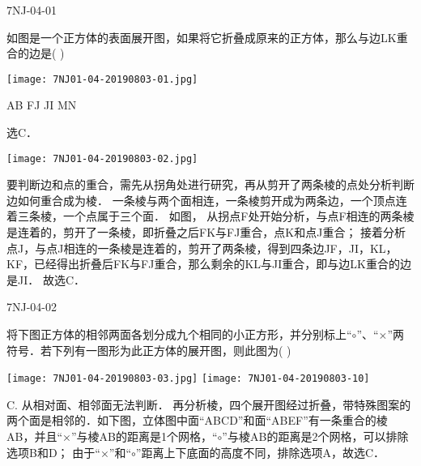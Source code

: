 \begin{defproblem}{7NJ-04-01}%
\begin{onlyproblem}%
如图是一个正方体的表面展开图，如果将它折叠成原来的正方体，那么与边LK重合的边是(    ) 
\begin{center}
\texttt{[image: 7NJ01-04-20190803-01.jpg]}
\end{center}
\xx
{AB}
{FJ}
{JI}
{MN}
\end{onlyproblem}%
\begin{onlysolution}%
\begin{solution}%
选C．
\begin{center}
\texttt{[image: 7NJ01-04-20190803-02.jpg]}
\end{center}

要判断边和点的重合，需先从拐角处进行研究，再从剪开了两条棱的点处分析判断边如何重合成为棱． 一条棱与两个面相连，一条棱剪开成为两条边，一个顶点连着三条棱，一个点属于三个面． 如图，   从拐点F处开始分析，与点F相连的两条棱是连着的，剪开了一条棱，即折叠之后FK与FJ重合，点K和点J重合； 接着分析点J，与点J相连的一条棱是连着的，剪开了两条棱，得到四条边JF，JI，KL，KF，已经得出折叠后FK与FJ重合，那么剩余的KL与JI重合，即与边LK重合的边是JI． 故选C． 
\end{solution}%
\end{onlysolution}%
\end{defproblem}





\begin{defproblem}{7NJ-04-02}%
\begin{onlyproblem}%
将下图正方体的相邻两面各划分成九个相同的小正方形，并分别标上“$\circ$”、“$\times$”两符号．若下列有一图形为此正方体的展开图，则此图为(    ) 
\begin{center}
\texttt{[image: 7NJ01-04-20190803-03.jpg]}
\texttt{[image: 7NJ01-04-20190803-10]}
\end{center}
\end{onlyproblem}%
\begin{onlysolution}%
\begin{solution}%
C.
从相对面、相邻面无法判断． 再分析棱，四个展开图经过折叠，带特殊图案的两个面是相邻的．如下图，立体图中面“ABCD”和面“ABEF”有一条重合的棱AB，并且“$\times$”与棱AB的距离是1个网格，“$\circ$”与棱AB的距离是2个网格，可以排除选项B和D； 由于“$\times$”和“$\circ$”距离上下底面的高度不同，排除选项A，故选C． 

\end{solution}%
\end{onlysolution}%
\end{defproblem}



